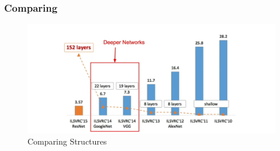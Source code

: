 \documentclass{beamer}
\begin{document}
\begin{frame}
\frametitle{Comparing}

\begin{figure}
	\includegraphics[width=\linewidth]{Pics/compare2.png}
	\caption{Comparing Structures}
\end{figure}

\end{frame}
\end{document}
